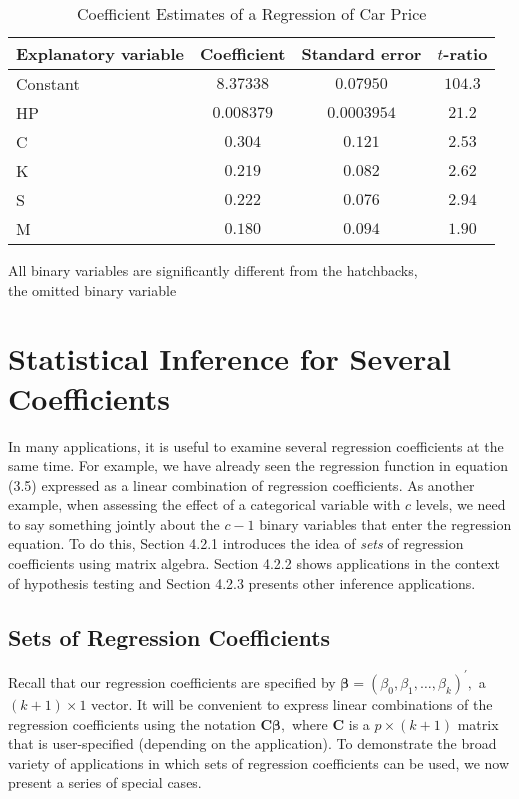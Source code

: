 \begin{table}[h]
 \caption{\label{T4:CarPriceRegression} Coefficient
Estimates of a Regression of Car Price}
\begin{tabular}{lccc}
\hline Explanatory variable & Coefficient & Standard error &
$t$-ratio
\\ \hline
Constant & $8.37338$ & $0.07950$ &$104.3$ \\
HP & $0.008379$ & $0.0003954$ & $21.2$ \\
C  & $0.304$ & $ 0.121$ & $2.53$ \\
K  & $0.219$ & $0.082$ & $2.62$ \\
S  & $0.222$ & $0.076$ & $2.94$ \\
M  & $0.180$ & $ 0.094$ & $1.90$ \\
 \hline
\end{tabular}

{\small All binary variables are significantly different from the
hatchbacks, \\
 the omitted binary variable}

\linetjed
\end{table}




\section{Statistical Inference for Several Coefficients}

In many applications, it is useful to examine several regression
coefficients at the same time. For example, we have already seen the
regression function in equation (3.5) expressed as a linear
combination of regression coefficients. As another example, when
assessing the effect of a categorical variable with $c$ levels, we
need to say something jointly about the $c-1$ binary variables that
enter the regression equation. To do this, Section 4.2.1 introduces
the idea of \emph{sets} of regression coefficients using matrix
algebra. Section 4.2.2 shows applications in the context of
hypothesis testing and Section 4.2.3 presents other inference
applications.


\subsection{Sets of Regression Coefficients}

Recall that our regression coefficients are specified by
$\boldsymbol \beta =\left( \beta _{0}, \beta _{1}, \dots,\beta
_{k}\right) ^{\prime },$ a $(k+1)\times 1$ vector. It will be
convenient to express linear combinations of the regression
coefficients using the notation $\mathbf{C} \boldsymbol \beta,$
where \textbf{C} is a $p\times (k+1)$ matrix that is user-specified
(depending on the application). To demonstrate the broad variety of
applications in which sets of regression coefficients can be used,
we now present a series of special cases.

